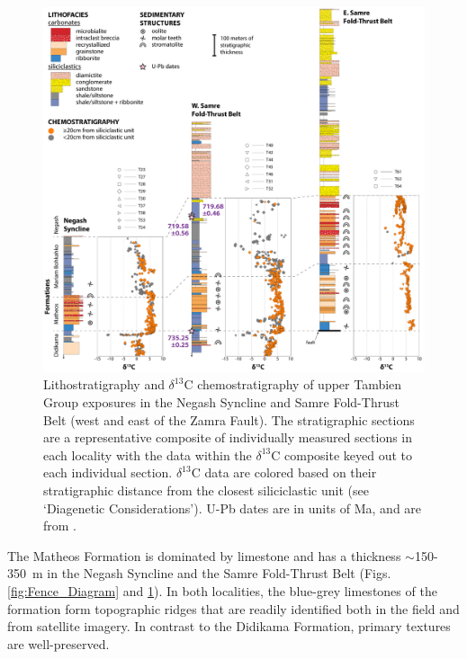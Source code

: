 \documentclass[11pt,letterpaper]{article}
\newcommand{\dC}{$\delta^{13}$C\xspace}
\begin{document}
\begin{figure}[h!]
\begin{center}
	\includegraphics[width=\textwidth]{Figures/Upper_Tambien_Comparison.pdf}
	\caption{Lithostratigraphy and \dC chemostratigraphy of upper Tambien Group exposures in the Negash Syncline and Samre Fold-Thrust Belt (west and east of the Zamra Fault). The stratigraphic sections are a representative composite of individually measured sections in each locality with the data within the \dC composite keyed out to each individual section. \dC data are colored based on their stratigraphic distance from the closest siliciclastic unit (see `Diagenetic Considerations'). U-Pb dates are in units of Ma, and are from \citet{MacLennan2018a}.}
	\label{fig:Upper_Tambien_Comparison}
\end{center}
\end{figure}

The Matheos Formation is dominated by limestone and has a thickness $\sim$150-350~m in the Negash Syncline and the Samre Fold-Thrust Belt (Figs. \ref{fig:Fence_Diagram} and \ref{fig:Upper_Tambien_Comparison}). In both localities, the blue-grey limestones of the formation form topographic ridges that are readily identified both in the field and from satellite imagery. In contrast to the Didikama Formation, primary textures are well-preserved.
\end{document}
